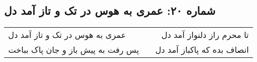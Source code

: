 \begin{center}
\section*{شماره ۲۰: عمری به هوس در تک و تاز آمد دل}
\label{sec:020}
\begin{longtable}{l p{0.5cm} r}
عمری به هوس در تک و تاز آمد دل
&&
تا محرم راز دلنواز آمد دل
\\
پس رفت به پیش باز و جان پاک بباخت
&&
انصاف بده که پاکباز آمد دل
\\
\end{longtable}
\end{center}
